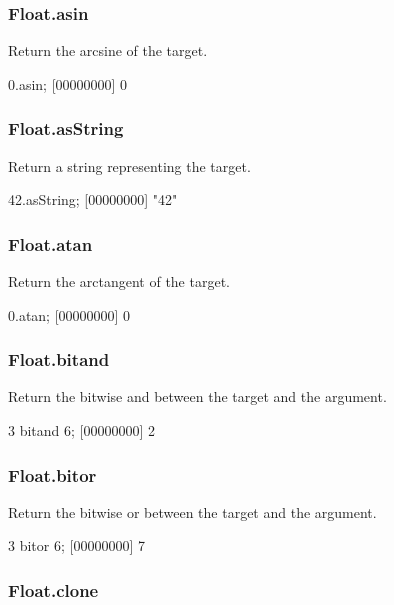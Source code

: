 \subsubsection{Float.asin}

Return the arcsine of the target.

\begin{urbiscript}
0.asin;
[00000000] 0
\end{urbiscript}

\subsubsection{Float.asString}

Return a string representing the target.

\begin{urbiscript}
42.asString;
[00000000] "42"
\end{urbiscript}

\subsubsection{Float.atan}

Return the arctangent of the target.

\begin{urbiscript}
0.atan;
[00000000] 0
\end{urbiscript}

\subsubsection{Float.bitand}

Return the bitwise and between the target and the argument.

\begin{urbiscript}
3 bitand 6;
[00000000] 2
\end{urbiscript}

\subsubsection{Float.bitor}

Return the bitwise or between the target and the argument.

\begin{urbiscript}
3 bitor 6;
[00000000] 7
\end{urbiscript}

\subsubsection{Float.clone}

